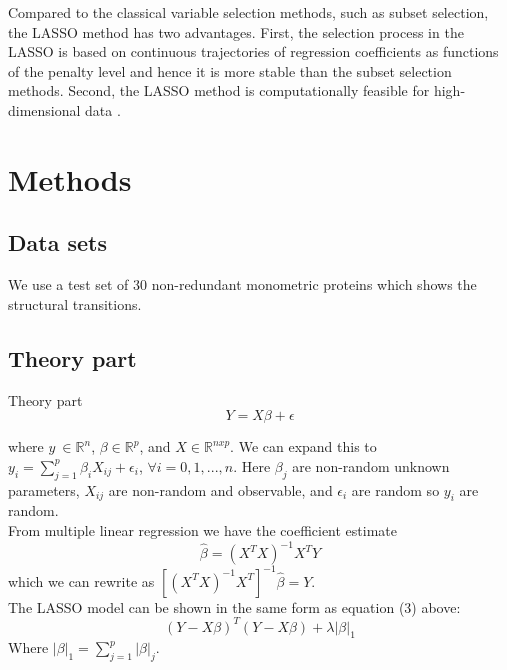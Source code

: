 \documentclass[12pt,twoside]{article}
\newcommand\red[1]{{\color{red}#1}}
\begin{document}
  
  Compared to the classical variable selection methods, such as subset selection, the LASSO method has two advantages. First, the selection process in the LASSO is based on continuous trajectories of regression coefficients as functions of the penalty level and hence it is more stable than the subset selection methods. 
  Second, the LASSO method is computationally feasible for high-dimensional data\cite{tibshirani1996regression,RePEc:eee:jmvana:v:132:y:2014:i:C:p:138-150,oai:CiteSeerPSU:302091} .


 
 \section{Methods}
 \subsection{\small{Data sets}}
 We use a test set of 30 non-redundant monometric proteins which shows the structural transitions.
 
  \subsection{\small{Theory part}}
 Theory part\begin{equation}
\label{eq:linreg}
Y = X\beta + \epsilon
\end{equation}

where $y\ \in \mathbb{R}^n$, $\beta \in \mathbb{R}^p$, and $X \in \mathbb{R}^{n x p}$. We can expand this to $y_i = \sum_{j = 1}^{p}\beta_iX_{ij} + \epsilon_i$, $\forall i = 0,1,...,n$. Here $\beta_j$ are non-random unknown parameters, $X_{ij}$ are non-random and observable, and $\epsilon_i$ are random so $y_i$ are random.\\From multiple linear regression we have the coefficient estimate 
\begin{equation}
\label{eq:betacoef}
\hat{\beta} = (X^TX)^{-1}X^TY
\end{equation}
which we can rewrite as $[(X^TX)^{-1}X^T]^{-1}\hat{\beta} = Y$.\\The LASSO model can be shown in the same form as equation (3) above:
\begin{equation}
\label{eq:LASSO OLS}
(Y-X\beta)^T(Y-X\beta) + \lambda|\beta|_1
\end{equation}
Where $|\beta|_1 = \sum\limits_{j=1}^{p}|\beta|_j$.
 
 
 
        
\end{document}
